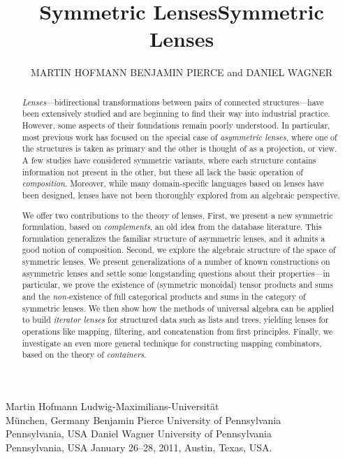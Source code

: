 \documentclass[prodmode,acmjacm]{acmsmall}
\title{Symmetric Lenses}
\author{MARTIN HOFMANN \affil{Ludwig-Maximilians-Universit\"at} BENJAMIN
PIERCE and DANIEL WAGNER \affil{University of Pennsylvania}}
\begin{document}
\title{Symmetric Lenses}
\authorinfo
    {Martin Hofmann}
    {Ludwig-Maximilians-Universit\"at \\ M\"unchen, Germany}
    {}
\authorinfo
    {Benjamin Pierce}
    {University of Pennsylvania \\ Pennsylvania, USA}
    {}
\authorinfo
    {Daniel Wagner}
    {University of Pennsylvania \\ Pennsylvania, USA}
    {}
 {January 26--28, 2011, Austin, Texas, USA.}
\maketitle
\fi

\iftext
\begin{abstract}
{\em Lenses}---bidirectional transformations between pairs of connected
structures---have been extensively studied and are beginning to find their
way into industrial practice. However, some aspects of their foundations
remain poorly understood.
%
In particular, most previous work has focused on the special case of {\em
  asymmetric lenses}, where one of the structures is taken as primary and
the other is thought of as a projection, or view.  A few studies have
considered symmetric variants, where each structure contains
information not present in the other, but these all 
lack the basic operation of {\em composition}.  Moreover,
while many domain-specific languages based on lenses have been designed,
lenses have not been thoroughly explored from an algebraic
perspective.

We offer two contributions to the theory of lenses.  
%
First, we present a new symmetric formulation, based on {\em complements},
an old idea from the database literature.  This formulation generalizes the
familiar structure of asymmetric lenses, and it admits a good notion of
composition.
Second, we explore the algebraic structure of the space of
symmetric lenses.  We present generalizations of a number of known
constructions on asymmetric lenses and settle some longstanding questions
about their properties---in particular, we prove the existence of (symmetric
monoidal) tensor products and sums and the {\em non-}existence of full
categorical products and sums in the category of symmetric lenses.  We then
show how the methods of universal 
algebra can be applied to build {\em iterator lenses} for structured data
such as lists and trees, yielding lenses for operations like
mapping, filtering, and concatenation from first principles.  Finally, we
investigate an even more general technique for constructing mapping
combinators, based on the theory of {\em containers}.
\end{abstract}
\fi
\end{document}
